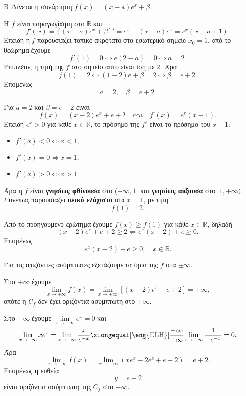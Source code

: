 \begin{thema}{Β}
Δίνεται η συνάρτηση $f(x)=(x-a)e^x+\beta$.

\begin{erwthma}
\item Η $f$ είναι παραγωγίσιμη στο $\mathbb{R}$ και
\[
f'(x)=\left[(x-a)e^x+\beta\right]'=e^x+(x-a)e^x=e^x(x-a+1).
\]
Επειδή η $f$ παρουσιάζει τοπικό ακρότατο στο εσωτερικό σημείο $x_0=1$, από το θεώρημα  έχουμε
\[
f'(1)=0\Leftrightarrow e(2-a)=0\Leftrightarrow a=2.
\]
Επιπλέον, η τιμή της $f$ στο σημείο αυτό είναι ίση με $2$. Άρα
\[
f(1)=2\Leftrightarrow (1-2)e+\beta=2\Leftrightarrow \beta=e+2.
\]
Επομένως
\[
a=2,\quad \beta=e+2.
\]

\item Για $a=2$ και $\beta=e+2$ είναι
\[
f(x)=(x-2)e^x+e+2
\quad\text{και}\quad
f'(x)=e^x(x-1).
\]
Επειδή $e^x>0$ για κάθε $x\in\mathbb{R}$, το πρόσημο της $f'$ είναι το πρόσημο του $x-1$:
\begin{itemize}
\item $f'(x)<0\Leftrightarrow x<1$,
\item $f'(x)=0\Leftrightarrow x=1$,
\item $f'(x)>0\Leftrightarrow x>1$.
\end{itemize}

\begin{center}
\end{center}

Άρα η $f$ είναι \textbf{γνησίως φθίνουσα} στο $(-\infty,1]$ και \textbf{γνησίως αύξουσα} στο $[1,+\infty)$. Συνεπώς παρουσιάζει \textbf{ολικό ελάχιστο} στο $x=1$, με τιμή
\[
f(1)=2.
\]

\item Από το προηγούμενο ερώτημα έχουμε $f(x)\geq f(1)$ για κάθε $x\in\mathbb{R}$, δηλαδή
\[
(x-2)e^x+e+2\geq 2\Leftrightarrow e^x(x-2)+e\geq 0.
\]
Επομένως
\[
e^x(x-2)+e\geq 0,\quad x\in\mathbb{R}.
\]

\item Για τις οριζόντιες ασύμπτωτες εξετάζουμε τα όρια της $f$ στα $\pm\infty$.

Στο $+\infty$ έχουμε
\[
\lim_{x\to+\infty}f(x)=\lim_{x\to+\infty}\left[(x-2)e^x+e+2\right]=+\infty,
\]
οπότε η $C_f$ δεν έχει οριζόντια ασύμπτωτη στο $+\infty$.

Στο $-\infty$ έχουμε $\lim\limits_{x\to-\infty}e^x=0$ και
\[
\lim_{x\to-\infty}xe^x
=\lim_{x\to-\infty}\frac{x}{e^{-x}}
\xlongequal[\text{\eng{DLH}}]{\frac{-\infty}{+\infty}}
\lim_{x\to-\infty}\frac{1}{-e^{-x}}=0.
\]
Άρα
\[
\lim_{x\to-\infty}f(x)
=\lim_{x\to-\infty}\left(xe^x-2e^x+e+2\right)=e+2.
\]
Επομένως η ευθεία
\[
y=e+2
\]
είναι οριζόντια ασύμπτωτη της $C_f$ στο $-\infty$.
\end{erwthma}
\end{thema}
